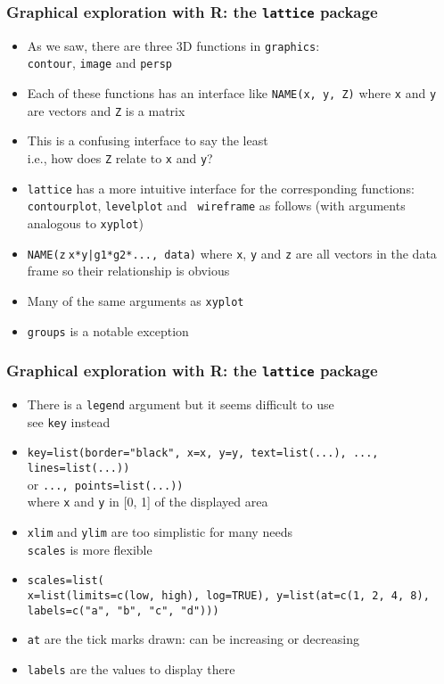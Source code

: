 \documentclass[11pt,pdftex,dvipsnames,usenames,helvetica]{beamer}
\begin{document}
\begin{frame}[fragile]
\frametitle{Graphical exploration with R: the {\tt lattice} package}
\begin{itemize}
\item As we saw, there are three 3D functions in {\tt graphics}:\\
{\tt contour}, {\tt image} and {\tt persp}
\item Each of these functions has an interface like 
{\tt NAME(x, y, Z)} where {\tt x} and {\tt y} are vectors
and {\tt Z} is a matrix
\item This is a confusing interface to say the least\\
 i.e., how does {\tt Z} relate to {\tt x} and {\tt y}?
\item {\tt lattice} has a more intuitive interface for the
  corresponding functions: {\tt contourplot}, {\tt levelplot} and {\tt
    wireframe} as follows (with arguments analogous to {\tt xyplot})
\item {\tt NAME(z$~$x*y|g1*g2*..., data)} where {\tt x}, {\tt y} and
{\tt z} are all vectors in the data frame so their relationship is obvious
\item Many of the same arguments as {\tt xyplot}
\item {\tt groups} is a notable exception
\end{itemize}
\end{frame}

\begin{frame}[fragile]
\frametitle{Graphical exploration with R: the {\tt lattice} package}
\begin{itemize}
\item There is a {\tt legend} argument but it seems difficult to use\\
see {\tt key} instead
\item {\tt key=list(border="black", x=x, y=y, text=list(...), ..., lines=list(...))}\\
or {\tt ..., points=list(...))} \\
where {\tt x} and {\tt y} in [0, 1] of the displayed area
\item {\tt xlim} and {\tt ylim} are too simplistic for many needs\\
{\tt scales} is more flexible
\item {\tt scales=list(\\
x=list(limits=c(low, high), log=TRUE),
y=list(at=c(1, 2, 4, 8),\\ \quad labels=c("a", "b", "c", "d")))}
\item {\tt at} are the tick marks drawn: can be increasing or decreasing
\item {\tt labels} are the values to display there
\end{itemize}
\end{frame}
\end{document}
